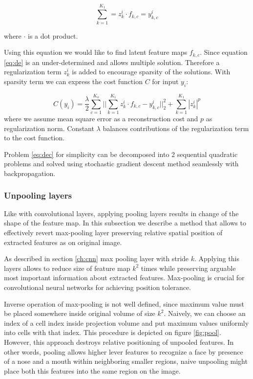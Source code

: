 \begin{equation}\label{eq:de}
  \sum^{K_1}_{k=1}=z^i_k \cdot f_{k,c} = y^i_{k,c}
\end{equation}

where $\cdot$ is a dot product.

Using this equation we would like to find latent feature maps $f_{k,c}$.
Since equation \ref{eq:de} is an under-determined and allows multiple solution.
Therefore a regularization term $z^i_k$ is added to encourage sparsity of the solutions.
With sparsity term we can express the cost function $C$ for input $y_i$:

\begin{equation}\label{eq:dec}
    C(y_i) = \frac{\lambda}{2} \sum^{K_o}_{c=1} ||\sum^{K_1}_{k=1}{z^i_k \cdot f_{k,c} - y^i_{k,c}}||^2_2 + \sum^{K_1}_{k=1}{|z^i_k|^p}
\end{equation}
where we assume mean square error as a reconstruction cost and $p$ as regularization norm.
Constant $\lambda$ balances contributions of the regularization term to the cost function.

Problem \ref{eq:dec} for simplicity can be decomposed into 2 sequential quadratic problems and solved using stochastic gradient descent method seamlessly with backpropagation.

\subsubsection{Unpooling layers}

Like with convolutional layers, applying pooling layers results in change of the shape of the feature map.
In this subsection we describe a method that allows to effectively revert max-pooling layer preserving relative spatial position of extracted features as on original image.

As described in section \ref{ch:cnn} max pooling layer with stride $k$.
Applying this layers allows to reduce size of feature map $k^2$ times while preserving arguable most important information about extracted features.
Max-pooling is crucial for convolutional neural networks for achieving position tolerance.

Inverse operation of max-pooling is not well defined, since maximum value must be placed somewhere inside original volume of size $k^2$. Naively, we can choose an index of a cell index inside projection volume and put maximum values uniformly into cells with that index.
This procedure is depicted on figure \ref{fig:pool}.
However, this approach destroys relative positioning of unpooled features.
In other words, pooling allows higher lever features to recognize a face by presence of a nose and a mouth within neighboring smaller regions, naive unpooling might place both this features into the same region on the image.


